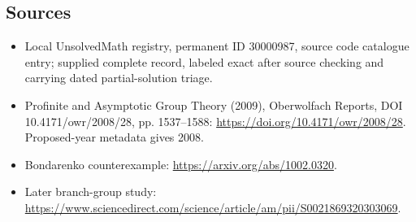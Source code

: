 \documentclass[11pt]{article}
\begin{document}
\subsection{Sources}
\begin{itemize}
\item Local UnsolvedMath registry, permanent ID 30000987, source code catalogue entry; supplied complete record, labeled exact after source checking and carrying dated partial-solution triage.
\item Profinite and Asymptotic Group Theory (2009), Oberwolfach Reports, DOI 10.4171/owr/2008/28, pp. 1537--1588: \url{https://doi.org/10.4171/owr/2008/28}. Proposed-year metadata gives 2008.
\item Bondarenko counterexample: \url{https://arxiv.org/abs/1002.0320}.
\item Later branch-group study: \url{https://www.sciencedirect.com/science/article/am/pii/S0021869320303069}.
\end{itemize}
\end{document}
